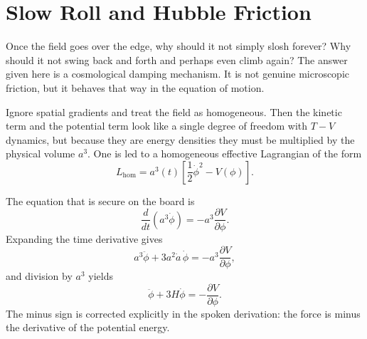 \begin{classroomqa}
\end{classroomqa}

\begin{classroomqa}
\end{classroomqa}

\section{Slow Roll and Hubble Friction}

Once the field goes over the edge, why should it not simply slosh forever? Why should it not swing back and forth and perhaps even climb again? The answer given here is a cosmological damping mechanism. It is not genuine microscopic friction, but it behaves that way in the equation of motion.

Ignore spatial gradients and treat the field as homogeneous. Then the kinetic term and the potential term look like a single degree of freedom with \(T-V\) dynamics, but because they are energy densities they must be multiplied by the physical volume \(a^3\). One is led to a homogeneous effective Lagrangian of the form
\begin{equation}
L_{\mathrm{hom}}=a^3(t)\left[\frac12\dot\phi^2-V(\phi)\right].
\end{equation}

The equation that is secure on the board is
\begin{equation}
\frac{d}{dt}\left(a^3\dot\phi\right)=-a^3\frac{\partial V}{\partial\phi}.
\end{equation}
Expanding the time derivative gives
\begin{equation}
a^3\ddot\phi+3a^2\dot a\,\dot\phi=-a^3\frac{\partial V}{\partial\phi},
\end{equation}
and division by \(a^3\) yields
\begin{equation}
\ddot\phi+3H\dot\phi=-\frac{\partial V}{\partial\phi}.
\end{equation}
The minus sign is corrected explicitly in the spoken derivation: the force is minus the derivative of the potential energy.


